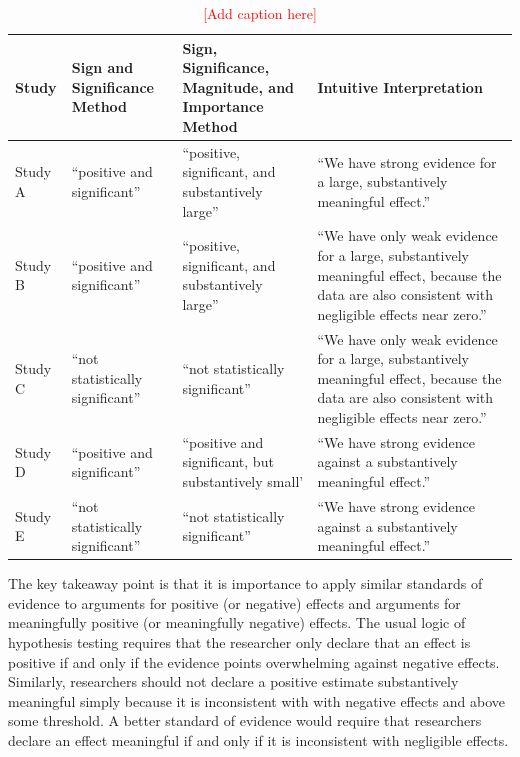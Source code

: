 \documentclass[12pt]{article}
\newcommand{\comment}[1]{\textcolor{red}{#1}}
\begin{document}
\renewcommand{\arraystretch}{1.5}
\begin{table}
\begin{center}
\begin{scriptsize}
\begin{tabular}{|>{\centering\arraybackslash}m{.5in}m{1.75in}>{\centering\arraybackslash}m{1.75in}>{\centering\arraybackslash}
m{1.75in}|}
\hline

Study & Sign and Significance Method & Sign, Significance, Magnitude, and Importance Method & Intuitive Interpretation\\ 
\hline
Study A & ``positive and significant'' & ``positive, significant, and substantively large'' & ``We have strong evidence for a large, substantively meaningful effect.''\\
Study B & ``positive and significant'' & ``positive, significant, and substantively large'' & ``We have only weak evidence for a large, substantively meaningful effect, because the data are also consistent with negligible effects near zero.''\\
Study C & ``not statistically significant'' & ``not statistically significant'' & ``We have only weak evidence for a large, substantively meaningful effect, because the data are also consistent with negligible effects near zero.''\\
Study D & ``positive and significant'' & ``positive and significant, but substantively small' & ``We have strong evidence against a substantively meaningful effect.''\\
Study E & ``not statistically significant'' & ``not statistically significant'' & ``We have strong evidence against a substantively meaningful effect.''\\
\hline
\end{tabular}\caption{\comment{[Add caption here]}}\label{tab:lit}
\end{scriptsize}
\end{center}
\end{table}

The key takeaway point is that it is importance to apply similar standards of evidence to arguments for positive (or negative) effects and arguments for meaningfully positive (or meaningfully negative) effects. The usual logic of hypothesis testing requires that the researcher only declare that an effect is positive if and only if the evidence points overwhelming against negative effects. Similarly, researchers should not declare a positive estimate substantively meaningful simply because it is inconsistent with with negative effects and above some threshold. A better standard of evidence would require that researchers declare an effect meaningful if and only if it is inconsistent with negligible effects.


%
%
\end{document}
